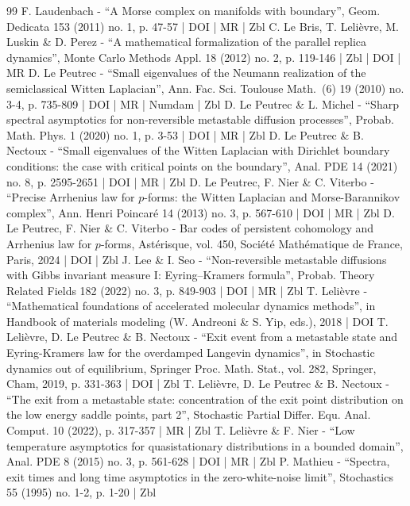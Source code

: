 \begin{thebibliography}{99}
F. Laudenbach - “A Morse complex on manifolds with boundary”, Geom. Dedicata 153 (2011) no. 1, p. 47-57 | DOI | MR | Zbl
C. Le Bris, T. Lelièvre, M. Luskin \& D. Perez - “A mathematical formalization of the parallel replica dynamics”, Monte Carlo Methods Appl. 18 (2012) no. 2, p. 119-146 | Zbl | DOI | MR
D. Le Peutrec - “Small eigenvalues of the Neumann realization of the semiclassical Witten Laplacian”, Ann. Fac. Sci. Toulouse Math. (6) 19 (2010) no. 3-4, p. 735-809 | DOI | MR | Numdam | Zbl
D. Le Peutrec \& L. Michel - “Sharp spectral asymptotics for non-reversible metastable diffusion processes”, Probab. Math. Phys. 1 (2020) no. 1, p. 3-53 | DOI | MR | Zbl
D. Le Peutrec \& B. Nectoux - “Small eigenvalues of the Witten Laplacian with Dirichlet boundary conditions: the case with critical points on the boundary”, Anal. PDE 14 (2021) no. 8, p. 2595-2651 | DOI | MR | Zbl
D. Le Peutrec, F. Nier \& C. Viterbo - “Precise Arrhenius law for $p$-forms: the Witten Laplacian and Morse-Barannikov complex”, Ann. Henri Poincaré 14 (2013) no. 3, p. 567-610 | DOI | MR | Zbl
D. Le Peutrec, F. Nier \& C. Viterbo - Bar codes of persistent cohomology and Arrhenius law for $p$-forms, Astérisque, vol. 450, Société Mathématique de France, Paris, 2024 | DOI | Zbl
J. Lee \& I. Seo - “Non-reversible metastable diffusions with Gibbs invariant measure I: Eyring–Kramers formula”, Probab. Theory Related Fields 182 (2022) no. 3, p. 849-903 | DOI | MR | Zbl
T. Lelièvre - “Mathematical foundations of accelerated molecular dynamics methods”, in Handbook of materials modeling (W. Andreoni \& S. Yip, eds.), 2018 | DOI
T. Lelièvre, D. Le Peutrec \& B. Nectoux - “Exit event from a metastable state and Eyring-Kramers law for the overdamped Langevin dynamics”, in Stochastic dynamics out of equilibrium, Springer Proc. Math. Stat., vol. 282, Springer, Cham, 2019, p. 331-363 | DOI | Zbl
T. Lelièvre, D. Le Peutrec \& B. Nectoux - “The exit from a metastable state: concentration of the exit point distribution on the low energy saddle points, part 2”, Stochastic Partial Differ. Equ. Anal. Comput. 10 (2022), p. 317-357 | MR | Zbl
T. Lelièvre \& F. Nier - “Low temperature asymptotics for quasistationary distributions in a bounded domain”, Anal. PDE 8 (2015) no. 3, p. 561-628 | DOI | MR | Zbl
P. Mathieu - “Spectra, exit times and long time asymptotics in the zero-white-noise limit”, Stochastics 55 (1995) no. 1-2, p. 1-20 | Zbl

\end{thebibliography}

